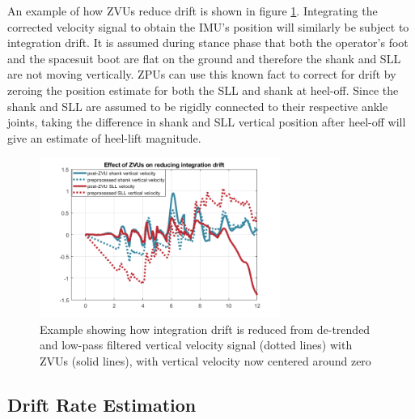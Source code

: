 \documentclass[defaultstyle,11pt]{comps}
\begin{document}
An example of how ZVUs reduce drift is shown in figure \ref{fig:drift}.
Integrating the corrected velocity signal to obtain the IMU's position will similarly be subject to integration drift.
It is assumed during stance phase that both the operator's foot and the spacesuit boot are flat on the ground and therefore the shank and SLL are not moving vertically.
ZPUs can use this known fact to correct for drift by zeroing the position estimate for both the SLL and shank at heel-off.
Since the shank and SLL are assumed to be rigidly connected to their respective ankle joints, taking the difference in shank and SLL vertical position after heel-off will give an estimate of heel-lift magnitude.

\begin{figure}
\hypertarget{fig:drift}{%
\centering
\includegraphics[width=0.7\textwidth,height=\textheight]{../fig/SA1/S3C1T1R_Drift.png}
\caption{Example showing how integration drift is reduced from de-trended and low-pass filtered vertical velocity signal (dotted lines) with ZVUs (solid lines), with vertical velocity now centered around zero}\label{fig:drift}
}
\end{figure}

\hypertarget{drift-rate-estimation}{%
\subsection{Drift Rate Estimation}\label{drift-rate-estimation}}
\end{document}
